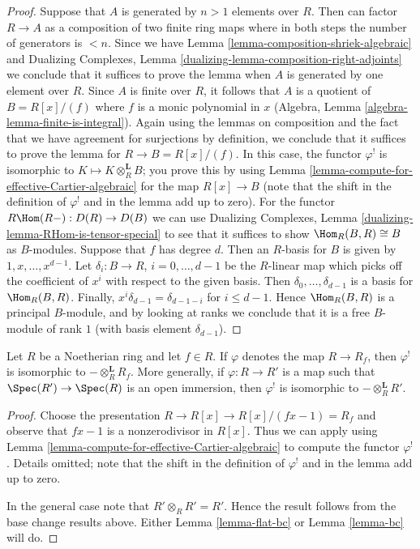 \begin{proof}
Suppose that $A$ is generated by $n > 1$ elements over $R$.
Then can factor $R \to A$ as a composition of two finite ring maps
where in both steps the number of generators is $< n$.
Since we have Lemma \ref{lemma-composition-shriek-algebraic} and
Dualizing Complexes, Lemma \ref{dualizing-lemma-composition-right-adjoints}
we conclude that it suffices
to prove the lemma when $A$ is generated by one element over $R$.
Since $A$ is finite over $R$, it follows that $A$ is a quotient
of $B = R[x]/(f)$ where $f$ is a monic polynomial in $x$
(Algebra, Lemma \ref{algebra-lemma-finite-is-integral}).
Again using the lemmas on composition and the fact that we
have agreement for surjections by definition, we conclude that
it suffices to prove the lemma for $R \to B = R[x]/(f)$.
In this case, the functor $\varphi^!$ is isomorphic to
$K \mapsto K \otimes_R^\mathbf{L} B$; you prove this by
using Lemma \ref{lemma-compute-for-effective-Cartier-algebraic}
for the map $R[x] \to B$ (note that the shift in the definition
of $\varphi^!$ and in the lemma add up to zero).
For the functor $R\Hom(R -) : D(R) \to D(B)$ we can use
Dualizing Complexes, Lemma \ref{dualizing-lemma-RHom-is-tensor-special}
to see that it suffices to show $\Hom_R(B, R) \cong B$
as $B$-modules. Suppose that $f$ has degree $d$.
Then an $R$-basis for $B$ is given by $1, x, \ldots, x^{d - 1}$.
Let $\delta_i : B \to R$, $i = 0, \ldots, d - 1$
be the $R$-linear map which picks off the coefficient
of $x^i$ with respect to the given basis. Then
$\delta_0, \ldots, \delta_{d - 1}$ is a basis for $\Hom_R(B, R)$.
Finally, $x^i \delta_{d - 1} = \delta_{d - 1 - i}$ for $i \leq d - 1$.
Hence $\Hom_R(B, R)$ is a principal $B$-module, and by looking
at ranks we conclude that it is a free $B$-module of rank $1$
(with basis element $\delta_{d - 1}$).
\end{proof}

\begin{lemma}
\label{lemma-upper-shriek-localize}
Let $R$ be a Noetherian ring and let $f \in R$.
If $\varphi$ denotes the map $R \to R_f$, then $\varphi^!$
is isomorphic to $- \otimes_R^\mathbf{L} R_f$.
More generally, if $\varphi : R \to R'$ is a map such that
$\Spec(R') \to \Spec(R)$ is an open immersion, then
$\varphi^!$ is isomorphic to $- \otimes_R^\mathbf{L} R'$.
\end{lemma}

\begin{proof}
Choose the presentation $R \to R[x] \to R[x]/(fx - 1) = R_f$ and observe
that $fx - 1$ is a nonzerodivisor in $R[x]$. Thus we can apply
using Lemma \ref{lemma-compute-for-effective-Cartier-algebraic}
to compute the functor $\varphi^!$. Details omitted;
note that the shift in the definition
of $\varphi^!$ and in the lemma add up to zero.

\medskip\noindent
In the general case note that $R' \otimes_R R' = R'$.
Hence the result follows from the base change results
above. Either Lemma \ref{lemma-flat-bc} or
Lemma \ref{lemma-bc} will do.
\end{proof}

